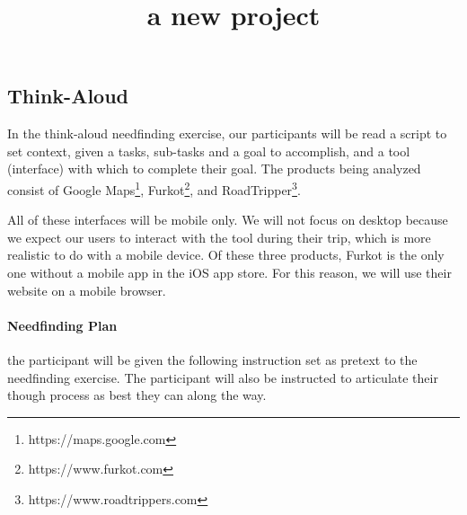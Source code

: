 

\title{a new project\\}



\maketitle
\thispagestyle{fancy}

\clearpage

\subsection{Think-Aloud}

In the think-aloud needfinding exercise, our participants will be read a script to set context, given a tasks, sub-tasks and a goal to accomplish, and a tool (interface) with which to complete their goal. The products being analyzed consist of Google Maps\footnote{https://maps.google.com}, Furkot\footnote{https://www.furkot.com}, and RoadTripper\footnote{https://www.roadtrippers.com}.

All of these interfaces will be mobile only. We will not focus on desktop because we expect our users to interact with the tool during their trip, which is more realistic to do with a mobile device. Of these three products, Furkot is the only one without a mobile app in the iOS app store. For this reason, we will use their website on a mobile browser.

\paragraph{Needfinding Plan} the participant will be given the following instruction set as pretext to the needfinding exercise. The participant will also be instructed to articulate their though process as best they can along the way.

